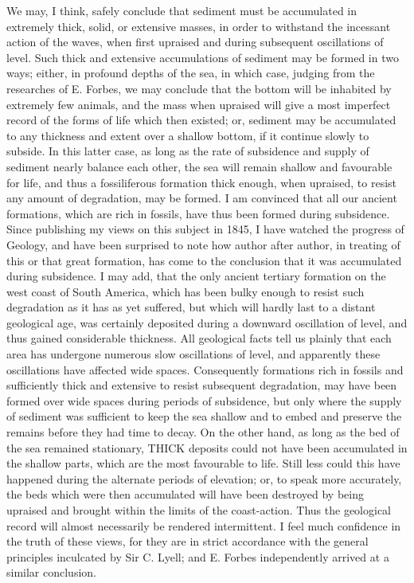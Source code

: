 We may, I think, safely conclude that sediment must be accumulated in extremely thick, solid, or extensive masses, in order to withstand the incessant action of the waves, when first upraised and during subsequent oscillations of level. Such thick and extensive accumulations of sediment may be formed in two ways; either, in profound depths of the sea, in which case, judging from the researches of E. Forbes, we may conclude that the bottom will be inhabited by extremely few animals, and the mass when upraised will give a most imperfect record of the forms of life which then existed; or, sediment may be accumulated to any thickness and extent over a shallow bottom, if it continue slowly to subside. In this latter case, as long as the rate of subsidence and supply of sediment nearly balance each other, the sea will remain shallow and favourable for life, and thus a fossiliferous formation thick enough, when upraised, to resist any amount of degradation, may be formed.
I am convinced that all our ancient formations, which are rich in fossils, have thus been formed during subsidence. Since publishing my views on this subject in 1845, I have watched the progress of Geology, and have been surprised to note how author after author, in treating of this or that great formation, has come to the conclusion that it was accumulated during subsidence. I may add, that the only ancient tertiary formation on the west coast of South America, which has been bulky enough to resist such degradation as it has as yet suffered, but which will hardly last to a distant geological age, was certainly deposited during a downward oscillation of level, and thus gained considerable thickness.
All geological facts tell us plainly that each area has undergone numerous slow oscillations of level, and apparently these oscillations have affected wide spaces. Consequently formations rich in fossils and sufficiently thick and extensive to resist subsequent degradation, may have been formed over wide spaces during periods of subsidence, but only where the supply of sediment was sufficient to keep the sea shallow and to embed and preserve the remains before they had time to decay. On the other hand, as long as the bed of the sea remained stationary, THICK deposits could not have been accumulated in the shallow parts, which are the most favourable to life. Still less could this have happened during the alternate periods of elevation; or, to speak more accurately, the beds which were then accumulated will have been destroyed by being upraised and brought within the limits of the coast-action.
Thus the geological record will almost necessarily be rendered intermittent. I feel much confidence in the truth of these views, for they are in strict accordance with the general principles inculcated by Sir C. Lyell; and E. Forbes independently arrived at a similar conclusion.
